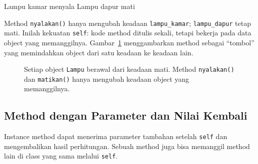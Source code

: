 \begin{keluaran}
Lampu kamar menyala
Lampu dapur mati
\end{keluaran}

Method \texttt{nyalakan()} hanya mengubah keadaan \texttt{lampu\_kamar}; \texttt{lampu\_dapur} tetap mati. Inilah kekuatan \texttt{self}: kode method ditulis sekali, tetapi bekerja pada data object yang memanggilnya. Gambar~\ref{fig:b1-lampu} menggambarkan method sebagai ``tombol'' yang memindahkan object dari satu keadaan ke keadaan lain.

\begin{figure}[htbp]
\centering
{}
\caption{Setiap object \texttt{Lampu} berawal dari keadaan mati. Method \texttt{nyalakan()} dan \texttt{matikan()} hanya mengubah keadaan object yang memanggilnya.}
\label{fig:b1-lampu}
\end{figure}

\subsection{Method dengan Parameter dan Nilai Kembali}

Instance method dapat menerima parameter tambahan setelah \texttt{self} dan mengembalikan hasil perhitungan. Sebuah method juga bisa memanggil method lain di class yang sama melalui \texttt{self}.

